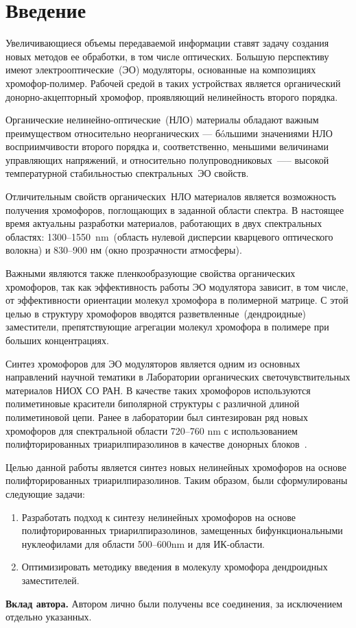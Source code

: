 \section{Введение}
Увеличивающиеся объемы передаваемой информации ставят задачу создания новых методов ее обработки, в том числе оптических. Большую перспективу имеют электрооптические~(ЭО) модуляторы, основанные на композициях хромофор-полимер. Рабочей средой в таких устройствах является органический донорно-акцепторный хромофор, проявляющий нелинейность второго порядка.

Органические нелинейно-оптические~(НЛО) материалы обладают важным преимуществом относительно неорганических — бóльшими значениями НЛО восприимчивости второго порядка и, соответственно, меньшими величинами управляющих напряжений, и относительно полупроводниковых~—-- высокой температурной стабильностью спектральных~ЭО свойств.

Отличительным свойств органических~НЛО материалов является возможность получения хромофоров, поглощающих в заданной области спектра. В настоящее время актуальны разработки материалов, работающих в двух спектральных областях: 1300--1550~\si{\nano\metre}~(область нулевой дисперсии кварцевого оптического волокна) и 830--900 нм (окно прозрачности атмосферы).

Важными являются также пленкообразующие свойства органических хромофоров, так как эффективность работы ЭО модулятора зависит, в том числе, от эффективности ориентации молекул хромофора в полимерной матрице. С этой целью в структуру хромофоров вводятся разветвленные~(дендроидные) заместители, препятствующие агрегации молекул хромофора в полимере при больших концентрациях.

Синтез хромофоров для ЭО модуляторов является одним из основных направлений научной тематики в Лаборатории органических светочувствительных материалов НИОХ СО РАН. В качестве таких хромофоров используются полиметиновые красители биполярной структуры с различной длиной полиметиновой цепи. Ранее в лаборатории был синтезирован ряд новых хромофоров для спектральной области 720--760 \si{\nano\metre} с использованием полифторированных триарилпиразолинов в качестве донорных блоков~\cite{2019}.

Целью данной работы является синтез новых нелинейных хромофоров на основе полифторированных триарилпиразолинов. Таким образом, были сформулированы следующие задачи:
\begin{enumerate}
    \item Разработать подход к синтезу нелинейных хромофоров на основе полифторированных триарилпиразолинов, замещенных бифункциональными нуклеофилами для области 500--600\si{\nano\metre} и для ИК-области.
    \item Оптимизировать методику введения в молекулу хромофора дендроидных заместителей.
\end{enumerate}

\textbf{Вклад автора.} Автором лично были получены все соединения, за исключением отдельно указанных. 
